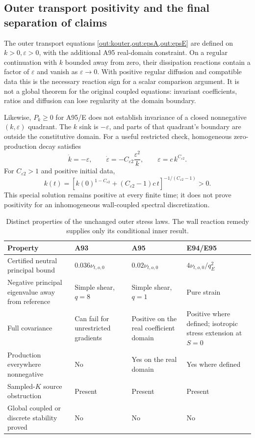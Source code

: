 \documentclass[11pt,a4paper]{article}
\numberwithin{equation}{section}
\newcommand{\eps}{\varepsilon}
\begin{document}
\subsection{Outer transport positivity and the final separation of claims}
\label{st:outer-positivity}

The outer transport equations
\cref{out:kouter,out:epsA,out:epsE} are defined on $k>0,\eps>0$,
with the additional
A95 real-domain constraint. On a regular continuation with $k$
bounded away from zero, their dissipation reactions contain a
factor of $\eps$ and vanish as $\eps\to0$. With positive regular
diffusion and compatible data this is the necessary reaction
sign for a scalar comparison argument. It is not a global theorem
for the original coupled equations: invariant coefficients,
ratios and diffusion can lose regularity at the domain boundary.

Likewise, $P_k\ge0$ for A95/E does not establish invariance of a
closed nonnegative $(k,\eps)$ quadrant. The $k$ sink is $-\eps$,
and parts of that quadrant's boundary are outside the constitutive
domain. For a useful restricted check, homogeneous zero-production
decay satisfies
\[
 \dot k=-\eps,\qquad
 \dot\eps=-C_{\eps2}\frac{\eps^2}{k},\qquad
 \eps=c\,k^{C_{\eps2}}.
\]
For $C_{\eps2}>1$ and positive initial data,
\[
 k(t)=\left[k(0)^{1-C_{\eps2}}
          +(C_{\eps2}-1)c\,t\right]^{-1/(C_{\eps2}-1)}>0.
\]
This special solution remains positive at every finite time; it
does not prove positivity for an inhomogeneous wall-coupled
spectral discretization.

\begin{table}[htbp]
\centering\small
\caption{Distinct properties of the unchanged outer stress laws.
The wall reaction remedy supplies only its conditional inner result.}
\label{st:comparison}
\begin{tabularx}{\linewidth}{@{}>{\raggedright\arraybackslash}p{.28\linewidth}YYY@{}}
\toprule
Property & A93 & A95 & E94/E95\\
\midrule
Certified neutral principal bound
& $0.036\nu_{t,o,0}$ & $0.02\nu_{t,o,0}$
& $4\nu_{t,o,0}/q_E^2$\\
Negative principal eigenvalue away from reference
& Simple shear, $q=8$ & Simple shear, $q=1$ & Pure strain\\
Full covariance
& Can fail for unrestricted gradients
& Positive on the real coefficient domain
& Positive where defined; isotropic stress extension at $S=0$\\
Production everywhere nonnegative
& No & Yes on the real domain & Yes where defined\\
Sampled-$K$ source obstruction
& Present & Present & Present\\
Global coupled or discrete stability proved
& No & No & No\\
\bottomrule
\end{tabularx}
\end{table}
\end{document}

